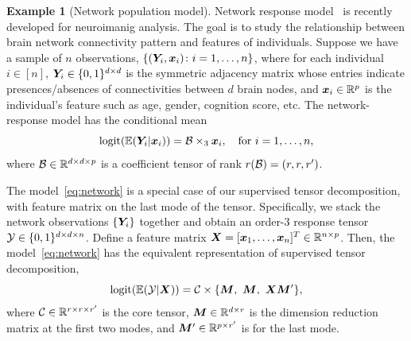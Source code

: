 \documentclass[12pt]{article}
\theoremstyle{plain}
\theoremstyle{definition}
\newtheorem{example}{Example}
\begin{document}
\begin{example}[Network population model]\label{example:brain}
Network response model~\citep{rabusseau2016low, zhang2018network} is recently developed for neuroimanig analysis. The goal is to study the relationship between brain network connectivity pattern and features of individuals. Suppose we have a sample of $n$ observations, $\{(\bm Y_i, \bm x_i)\colon i=1,\ldots,n\}$, where for each individual $i\in[n]$, $\bm Y_i\in\{0,1\}^{d\times d}$ is the symmetric adjacency matrix whose entries indicate presences/absences of connectivities between $d$ brain nodes, and $\bm x_i\in\mathbb{R}^p$ is the individual's feature such as age, gender, cognition score, etc. The network-response model  has the conditional mean
\begin{equation}\label{eq:network}
\text{logit}(\mathbb{E}(\bm Y_i|\bm x_i))=\mathcal{B}\times_3\bm x_i, \quad \text{for }i=1,\ldots,n,
\end{equation}
where $\mathcal{B}\in \mathbb{R}^{d\times d\times p}$ is a coefficient tensor of rank $r(\mathcal{B})=(r,r,r')$.

The model~\eqref{eq:network} is a special case of our supervised tensor decomposition, with feature matrix on the last mode of the tensor. Specifically, we stack the network observations $\{\bm Y_i\}$ together and obtain an order-3 response tensor $\mathcal{Y}\in\{0,1\}^{d\times d\times n}$. Define a feature matrix $\bm X=[\bm x_1,\ldots,\bm x_n]^T\in\mathbb{R}^{n\times p}$. Then, the model~\eqref{eq:network} has the equivalent representation of supervised tensor decomposition,
\[
\text{logit}(\mathbb{E}(\tY|\mX))=\tC\times\{\mM,\ \mM,\ \mX\mM'\},
\]
where $\mathcal{C}\in\mathbb{R}^{r\times r\times r'}$ is the core tensor, $\bm M\in\mathbb{R}^{d\times r}$ is the dimension reduction matrix at the first two modes, and $\bm M'\in\mathbb{R}^{p\times r'}$ is for the last mode.  \end{example}
 
\end{document}
